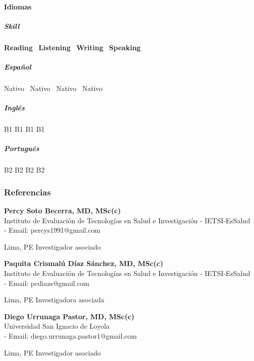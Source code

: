 \documentclass[
  letterpaper,
  DIV=11,
  numbers=noendperiod]{scrartcl}
\let\oldparagraph\paragraph
\renewcommand{\paragraph}[1]{\oldparagraph{#1}\mbox{}}
\let\oldsubparagraph\subparagraph
\renewcommand{\subparagraph}[1]{\oldsubparagraph{#1}\mbox{}}
\begin{document}
\hypertarget{idiomas}{%
\paragraph{Idiomas}\label{idiomas}}

\hypertarget{skill}{%
\subparagraph{\texorpdfstring{\emph{Skill}}{Skill}}\label{skill}}

\textbf{Reading}~ \textbf{Listening}~ \textbf{Writing}~
\textbf{Speaking}\\

\hypertarget{espauxf1ol}{%
\subparagraph{\texorpdfstring{\emph{Español}}{Español}}\label{espauxf1ol}}

Nativo~ Nativo~ Nativo~ Nativo\\

\hypertarget{ingluxe9s}{%
\subparagraph{\texorpdfstring{\emph{Inglés}}{Inglés}}\label{ingluxe9s}}

B1 B1 B1 B1

\hypertarget{portuguuxe9s}{%
\subparagraph{\texorpdfstring{\emph{Portugués}}{Portugués}}\label{portuguuxe9s}}

B2 B2 B2 B2

\hypertarget{referencias}{%
\subsubsection{Referencias}\label{referencias}}

\textbf{Percy Soto Becerra, MD, MSc(c)}\\
Instituto de Evaluación de Tecnologías en Salud e Investigación -
IETSI-EsSalud\\
- Email: percys1991@gmail.com

Lima, PE Investigador asociado

\textbf{Paquita Crismalú Díaz Sánchez, MD, MSc(c)}\\
Instituto de Evaluación de Tecnologías en Salud e Investigación -
IETSI-EsSalud\\
- Email: pcdiazs@gmail.com

Lima, PE Investigadora asociada

\textbf{Diego Urrunaga Pastor, MD, MSc(c)}\\
Universidad San Ignacio de Loyola\\
- Email: diego.urrunaga.pastor1@gmail.com

Lima, PE Investigador asociado
\end{document}
